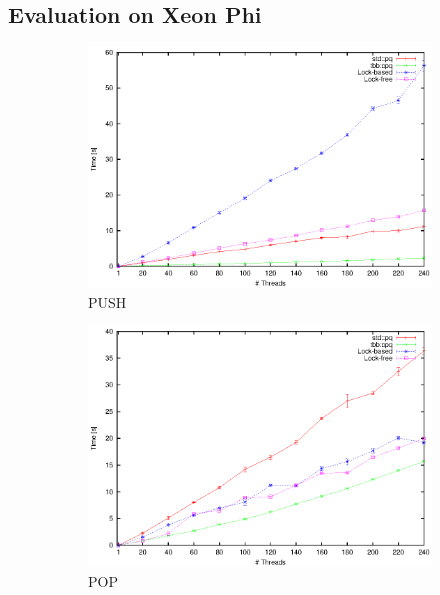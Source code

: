 \subsection{Evaluation on Xeon Phi}
\begin{figure}
	\centering
	\begin{subfigure}[b]{0.475\columnwidth}
		\centering
		\includegraphics[width=\textwidth]{../plots/xp_push/runtime_push}
		\caption{PUSH}
		\label{fig:xp_push}
	\end{subfigure}
	\hfill
	\begin{subfigure}[b]{0.475\columnwidth}
		\centering
		\includegraphics[width=\textwidth]{../plots/xp_pop/runtime_pop}
		\caption{POP}
		\label{fig:xp_pop}
	\end{subfigure}
	\hfill
	\begin{subfigure}[b]{0.475\columnwidth}

\end{subfigure}
\end{figure}
